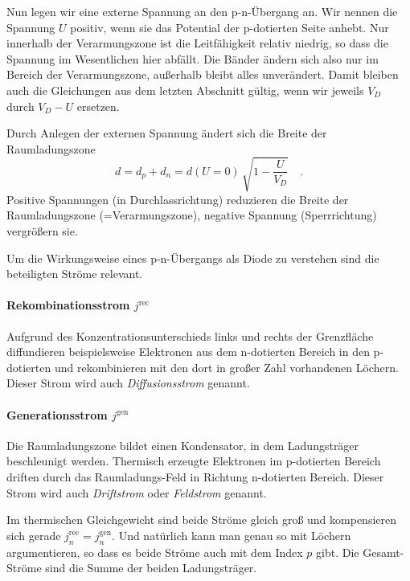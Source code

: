 Nun legen wir eine externe Spannung an den p-n-Übergang an. Wir nennen die Spannung $U$ positiv, wenn sie das Potential der p-dotierten Seite anhebt. Nur innerhalb der  Verarmungszone ist die Leitfähigkeit relativ niedrig, so dass die Spannung im Wesentlichen hier abfällt. Die Bänder ändern sich also nur im Bereich der Verarmungszone, außerhalb bleibt alles unverändert. Damit bleiben auch die Gleichungen aus dem letzten Abschnitt gültig, wenn wir jeweils $V_D$ durch $V_D - U$ ersetzen.

Durch Anlegen der externen Spannung ändert sich die Breite der Raumladungszone
\begin{equation}
    d = d_p + d_n = d(U=0) \, \sqrt{1 - \frac{U}{V_D} }\quad .
\end{equation} 
Positive Spannungen (in Durchlassrichtung) reduzieren die Breite der Raumladungszone (=Verarmungszone), negative Spannung (Sperrrichtung) vergrößern sie. 

Um die Wirkungsweise eines p-n-Übergangs als Diode zu verstehen sind die beteiligten Ströme relevant.

\paragraph*{Rekombinationsstrom  $j^\text{rec}$} Aufgrund des Konzentrationsunterschieds links und rechts der Grenzfläche diffundieren beispielsweise Elektronen aus dem n-dotierten Bereich  in den p-dotierten und rekombinieren mit den dort in großer Zahl vorhandenen Löchern. Dieser Strom wird auch \emph{Diffusionsstrom} genannt.

\paragraph*{Generationsstrom $j^\text{gen}$} Die Raumladungszone bildet einen Kondensator, in dem Ladungsträger beschleunigt werden. Thermisch erzeugte Elektronen im p-dotierten Bereich driften durch das Raumladungs-Feld in Richtung n-dotierten Bereich. Dieser Strom wird auch \emph{Driftstrom} oder \emph{Feldstrom} genannt.

Im thermischen Gleichgewicht sind beide Ströme gleich groß und kompensieren sich gerade $j_n^\text{rec} = j_n^\text{gen}$. Und natürlich kann man genau so mit Löchern argumentieren, so dass es beide Ströme auch mit dem Index $p$ gibt. Die Gesamt-Ströme sind die Summe der beiden Ladungsträger.

